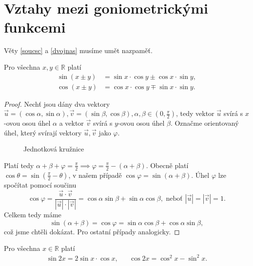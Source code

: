 \section{Vztahy mezi goniometrickými funkcemi}
\begin{pozn}
    Věty \ref{soucsc} a \ref{dvojnas}
    musíme umět nazpaměť.
\end{pozn}

\begin{veta}\label{soucsc}
    Pro všechna $ x, y \in \mathbb{R} $ platí
    \begin{align*}
        \sin \left(x\pm y\right) & = \sin x \cdot \cos y \pm \cos x \cdot \sin y, \\
        \cos \left(x\pm y\right) & = \cos x \cdot \cos y \mp \sin x \cdot \sin y.
    \end{align*}
\end{veta}

\begin{proof}
    Nechť jsou dány dva vektory $\vec u=(\cos \alpha, \sin \alpha), \vec v = (\sin \beta, \cos \beta), \alpha, \beta \in \left( 0,\frac{\pi}{2} \right ) $,
    tedy vektor $\vec u$ svírá s $x$-ovou osou úhel $\alpha$ a vektor $\vec v$ svírá s
    $y$-ovou osou úhel $\beta$. Označme orientovaný úhel, který svírají vektory $\vec u,\vec v$
    jako $\varphi$.
    \begin{figure}[h!]
        \centering
        \caption{Jednotková kružnice}
    \end{figure}
    Platí tedy $\alpha+\beta+\varphi=\frac{\pi}{2}\implies \varphi = \frac{\pi}{2}-(\alpha+\beta)$.
    Obecně platí $\cos \theta = \sin \left ( \frac{\pi}{2}-\theta \right ) $, v našem
    případě $\cos \varphi=\sin (\alpha+\beta).$ Úhel $\varphi$ lze spočítat pomocí
    součinu
    $$\cos \varphi = \frac{\vec u\cdot \vec v}{|\vec u|\cdot |\vec v|}=\cos \alpha \sin \beta + \sin \alpha \cos \beta, \textrm{ neboť } |\vec u| = |\vec v| = 1.$$
    Celkem tedy máme
    $$\sin (\alpha+\beta) = \cos \varphi = \sin \alpha \cos \beta+\cos \alpha \sin \beta,$$
    což jsme chtěli dokázat. Pro ostatní případy analogicky.
\end{proof}

\begin{veta}\label{dvojnas}
    Pro všechna $ x \in \mathbb{R}$ platí
    \begin{align*}
        \sin 2x = 2\sin x \cdot \cos x, & & \cos 2x = \cos^2 x - \sin^2 x.
    \end{align*}
\end{veta}

